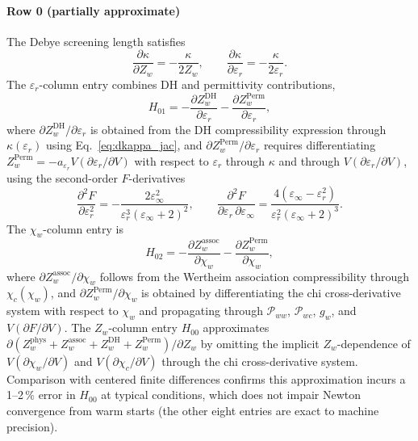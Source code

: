 \documentclass[preprint,12pt,authoryear]{elsarticle}
\begin{document}
\paragraph{Row 0 (partially approximate)}
The Debye screening length satisfies
\begin{equation}
  \frac{\partial\kappa}{\partial Z_w} = -\frac{\kappa}{2Z_w}, \qquad
  \frac{\partial\kappa}{\partial\varepsilon_r} = -\frac{\kappa}{2\varepsilon_r}.
  \label{eq:dkappa_jac}
\end{equation}
The $\varepsilon_r$-column entry combines DH and permittivity contributions,
\begin{equation}
  H_{01} = -\frac{\partial Z_w^{\text{DH}}}{\partial\varepsilon_r}
           - \frac{\partial Z_w^{\text{Perm}}}{\partial\varepsilon_r},
  \label{eq:H01}
\end{equation}
where $\partial Z_w^{\text{DH}}/\partial\varepsilon_r$ is obtained from the
DH compressibility expression \citep{Coelho2025} through $\kappa(\varepsilon_r)$
using Eq.~\eqref{eq:dkappa_jac}, and $\partial Z_w^{\text{Perm}}/\partial\varepsilon_r$
requires differentiating $Z_w^{\text{Perm}} = -a_{\varepsilon_r}V(\partial\varepsilon_r/\partial V)$
with respect to $\varepsilon_r$ through $\kappa$ and through $V(\partial\varepsilon_r/\partial V)$,
using the second-order $F$-derivatives
\begin{equation}
  \frac{\partial^2 F}{\partial\varepsilon_r^2}
    = -\frac{2\varepsilon_\infty^2}{\varepsilon_r^3(\varepsilon_\infty+2)^2}, \qquad
  \frac{\partial^2 F}{\partial\varepsilon_r\,\partial\varepsilon_\infty}
    = \frac{4(\varepsilon_\infty - \varepsilon_r^2)}{\varepsilon_r^2(\varepsilon_\infty+2)^3}.
  \label{eq:d2F_jac}
\end{equation}
The $\chi_w$-column entry is
\begin{equation}
  H_{02} = -\frac{\partial Z_w^{\text{assoc}}}{\partial\chi_w}
           - \frac{\partial Z_w^{\text{Perm}}}{\partial\chi_w},
  \label{eq:H02}
\end{equation}
where $\partial Z_w^{\text{assoc}}/\partial\chi_w$ follows from the
Wertheim association compressibility \citep{Coelho2025} through $\chi_c(\chi_w)$, and
$\partial Z_w^{\text{Perm}}/\partial\chi_w$ is obtained by differentiating
the chi cross-derivative system with respect to $\chi_w$ and propagating
through $\mathcal{P}_{ww}$, $\mathcal{P}_{wc}$, $g_w$, and $V(\partial F/\partial V)$.
The $Z_w$-column entry $H_{00}$ approximates
$\partial(Z_w^{\text{phys}}+Z_w^{\text{assoc}}+Z_w^{\text{DH}}+Z_w^{\text{Perm}})/\partial Z_w$
by omitting the implicit $Z_w$-dependence of $V(\partial\chi_w/\partial V)$ and
$V(\partial\chi_c/\partial V)$ through the chi cross-derivative system.
Comparison with centered finite differences confirms this approximation
incurs a 1--2\,\% error in $H_{00}$ at typical conditions, which does not
impair Newton convergence from warm starts (the other eight entries are exact
to machine precision).
\end{document}
